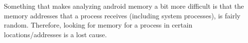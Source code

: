 Something that makes analyzing android memory a bit more difficult is that the memory addresses that a process
receives (including system processes), is fairly random. Therefore, looking for memory for a process in certain
locations/addresses is a lost cause. %



%
%

